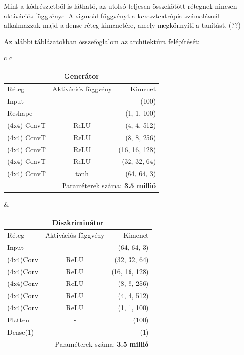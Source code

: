 Mint a kódrészletből is látható, az utolsó teljesen összekötött rétegnek nincsen aktivációs függvénye. A sigmoid függvényt a keresztentrópia számolásnál alkalmazzuk majd a dense réteg kimenetére, amely megkönnyíti a tanítást. (??)

Az alábbi táblázatokban összefoglalom az architektúra felépítését:
\begin{center}

\begin{tabular}{c c}

\scriptsize{
\begin{tabular}{ |l|c|r| }
	\hline
	\multicolumn{3}{|c|}{\textbf{Generátor}} \\
	\hline
	Réteg & Aktivációs függvény & Kimenet\\
	\hline
	Input & - & (100)\\
	Reshape & - & (1, 1, 100)\\
	(4x4) ConvT & ReLU & (4, 4, 512)\\
	(4x4) ConvT & ReLU & (8, 8, 256)\\
	(4x4) ConvT & ReLU & (16, 16, 128)\\
	(4x4) ConvT & ReLU & (32, 32, 64)\\
	(4x4) ConvT & tanh & (64, 64, 3)\\
	\hline
	\multicolumn{3}{|r|}{Paraméterek száma: \textbf{3.5 millió}} \\
	\hline
\end{tabular}}

&\scriptsize{
\begin{tabular}{ |l|c|r| }
	\hline
	\multicolumn{3}{|c|}{\textbf{Diszkriminátor}} \\
	\hline
	Réteg & Aktivációs függvény & Kimenet\\
	\hline
	Input & - & (64, 64, 3)\\
	(4x4)Conv & ReLU & (32, 32, 64)\\
	(4x4)Conv & ReLU & (16, 16, 128)\\
	(4x4)Conv & ReLU & (8, 8, 256)\\
	(4x4)Conv & ReLU & (4, 4, 512)\\
	(4x4)Conv & ReLU & (1, 1, 100)\\
	Flatten & - & (100)\\
	Dense(1) & - & (1)\\
	\hline
	\multicolumn{3}{|r|}{Paraméterek száma: \textbf{3.5 millió}} \\
	\hline
\end{tabular}}

\end{tabular}
\end{center}

